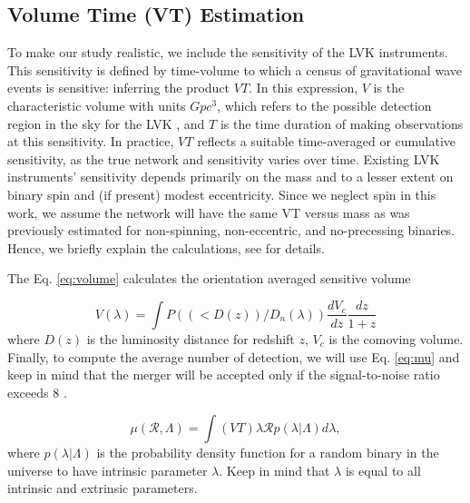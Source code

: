 \documentclass[twocolumn,prd,nofootinbib]{revtex4}
\begin{document}
\subsection{Volume Time (VT) Estimation}

To make our study realistic, we include the sensitivity of the LVK instruments. This sensitivity is defined by time-volume to which a census of gravitational wave events is sensitive: inferring the product $VT$.  In this expression, $V$ is the characteristic volume with units $Gpc^{3}$, which refers to the possible detection region in the sky for the LVK \cite{Volume_1993}, and $T$ is the time duration of making observations at this sensitivity.  In practice, $VT$ reflects a suitable time-averaged or cumulative sensitivity, as the true network and sensitivity varies over time.
Existing LVK instruments' sensitivity depends primarily on the mass and to a lesser extent on binary spin and (if present) modest eccentricity.  Since we neglect spin in this work, we assume the network will have the same  VT versus mass as was previously estimated  \cite{Dan_2019} for non-spinning, non-eccentric, and no-precessing binaries. Hence, we briefly explain the calculations, see \cite{Dan_2019} for details.

The Eq. \ref{eq:volume} calculates the orientation averaged sensitive volume \cite{Abbott_2016,richard2010volume}

\begin{equation}
\label{eq:volume}
V(\lambda) = \int P((<D(z))/D_n(\lambda))\frac{dV_c}{dz}\frac{dz}{1+z}
\end{equation}    
where $D(z)$ is the luminosity distance for redshift $z$, $V_c$ is the comoving volume. Finally, to compute the average number of detection, we will use Eq. \ref{eq:mu} and keep in mind that the merger will be accepted only if the signal-to-noise ratio exceeds 8 \cite{SNR_2010}.

\begin{equation}
\label{eq:mu}
  \mu(\mathcal{R},\Lambda) = \int(VT)\lambda \mathcal{R}p(\lambda|\Lambda)d\lambda ,
\end{equation}
where $p(\lambda|\Lambda)$ is the probability density function for a random binary in the universe to have intrinsic parameter $\lambda$. Keep in mind that $\lambda$ is equal to all intrinsic and extrinsic parameters.
\end{document}
